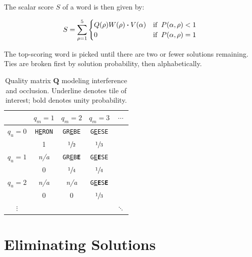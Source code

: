 \documentclass[twocolumn]{tudelft-aiaa}
\begin{document}
The scalar score $S$ of a word is then given by:

\begin{equation}
\label{equation_p_vs_v}
S = \sum_{\rho=1}^{5}\begin{cases} 
	Q(\rho) W(\rho) \boldsymbol{\cdot} V(\alpha) & \text{if} \hspace{2mm} P(\alpha,\rho)<1\\
	0 & \text{if} \hspace{2mm} P(\alpha,\rho)=1\\
   \end{cases}
\end{equation}

The top-scoring word is picked until there are two or fewer solutions remaining. Ties are broken first by solution probability, then alphabetically.

\begin{table}[h!]
\begin{centering}
\begin{tabular}{c || c | c | c | c}
& $q_m=1$ & $q_m=2$ & $q_m=3$ & $\cdots$ \\
\hline \hline
$q_u=0$ & \texttt{H\underline{E}RON} & \texttt{GR\underline{E}BE} & \texttt{G\underline{E}ESE} & \\
 & 1 & $\sfrac{1}{2}$ & $\sfrac{1}{3}$ & \\
\hline
$q_u=1$ & \emph{n/a}  & \texttt{GR\underline{E}B\textbf{E}} & \texttt{G\underline{E}\textbf{E}SE} & \\
 & 0 & $\sfrac{1}{4}$ & $\sfrac{1}{4}$ & \\
\hline
$q_u=2$ & \emph{n/a} & \emph{n/a} & \texttt{G\underline{E}\textbf{E}S\textbf{E}} & \\
 & 0 & 0 & $\sfrac{1}{3}$ & \\
\hline
$\vdots$ & & & & $\ddots$ \\
\end{tabular}
\vspace{2 mm}
\caption{Quality matrix $\boldsymbol{Q}$ modeling interference and occlusion. \rm Underline denotes tile of interest; bold denotes unity probability.}
\label{table_Q_matrix}
\end{centering}
\end{table}

\pagebreak

\section{Eliminating Solutions}
\end{document}
